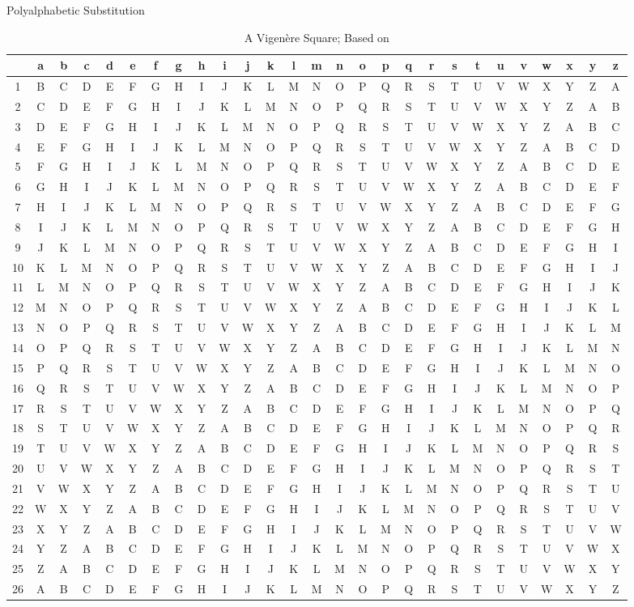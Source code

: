 \documentclass[]{beamer}
\begin{document}
\begin{frame}{Polyalphabetic Substitution}
	\begin{table}
		\centering
		\resizebox{10.5cm}{!} {
			\begin{tabular}{c c c c c c c c c c c c c c c c c c c c c c c c c c c}
				\hline
				& a & b & c & d & e & f & g & h & i & j & k & l & m & n & o & p & q & r & s & t & u & v & w & x & y & z\\
				\hline
				1 &B&C&D&E&F&G&H&I&J&K&L&M&N&O&P&Q&R&S&T&U&V&W&X&Y&Z&A \\
				2 &C&D&E&F&G&H&I&J&K&L&M&N&O&P&Q&R&S&T&U&V&W&X&Y&Z&A&B \\
				3 &D&E&F&G&H&I&J&K&L&M&N&O&P&Q&R&S&T&U&V&W&X&Y&Z&A&B&C \\
				4 &E&F&G&H&I&J&K&L&M&N&O&P&Q&R&S&T&U&V&W&X&Y&Z&A&B&C&D \\
				5 &F&G&H&I&J&K&L&M&N&O&P&Q&R&S&T&U&V&W&X&Y&Z&A&B&C&D&E \\
				6 &G&H&I&J&K&L&M&N&O&P&Q&R&S&T&U&V&W&X&Y&Z&A&B&C&D&E&F \\
				7 &H&I&J&K&L&M&N&O&P&Q&R&S&T&U&V&W&X&Y&Z&A&B&C&D&E&F&G \\
				8 &I&J&K&L&M&N&O&P&Q&R&S&T&U&V&W&X&Y&Z&A&B&C&D&E&F&G&H \\
				9 &J&K&L&M&N&O&P&Q&R&S&T&U&V&W&X&Y&Z&A&B&C&D&E&F&G&H&I \\
				10 &K&L&M&N&O&P&Q&R&S&T&U&V&W&X&Y&Z&A&B&C&D&E&F&G&H&I&J \\
				11 &L&M&N&O&P&Q&R&S&T&U&V&W&X&Y&Z&A&B&C&D&E&F&G&H&I&J&K \\
				12 &M&N&O&P&Q&R&S&T&U&V&W&X&Y&Z&A&B&C&D&E&F&G&H&I&J&K&L \\
				13 &N&O&P&Q&R&S&T&U&V&W&X&Y&Z&A&B&C&D&E&F&G&H&I&J&K&L&M \\
				14 &O&P&Q&R&S&T&U&V&W&X&Y&Z&A&B&C&D&E&F&G&H&I&J&K&L&M&N \\
				15 &P&Q&R&S&T&U&V&W&X&Y&Z&A&B&C&D&E&F&G&H&I&J&K&L&M&N&O \\
				16 &Q&R&S&T&U&V&W&X&Y&Z&A&B&C&D&E&F&G&H&I&J&K&L&M&N&O&P \\
				17 &R&S&T&U&V&W&X&Y&Z&A&B&C&D&E&F&G&H&I&J&K&L&M&N&O&P&Q \\
				18 &S&T&U&V&W&X&Y&Z&A&B&C&D&E&F&G&H&I&J&K&L&M&N&O&P&Q&R \\
				19 &T&U&V&W&X&Y&Z&A&B&C&D&E&F&G&H&I&J&K&L&M&N&O&P&Q&R&S \\
				20 &U&V&W&X&Y&Z&A&B&C&D&E&F&G&H&I&J&K&L&M&N&O&P&Q&R&S&T \\
				21 &V&W&X&Y&Z&A&B&C&D&E&F&G&H&I&J&K&L&M&N&O&P&Q&R&S&T&U \\
				22 &W&X&Y&Z&A&B&C&D&E&F&G&H&I&J&K&L&M&N&O&P&Q&R&S&T&U&V \\
				23 &X&Y&Z&A&B&C&D&E&F&G&H&I&J&K&L&M&N&O&P&Q&R&S&T&U&V&W \\
				24 &Y&Z&A&B&C&D&E&F&G&H&I&J&K&L&M&N&O&P&Q&R&S&T&U&V&W&X \\
				25 &Z&A&B&C&D&E&F&G&H&I&J&K&L&M&N&O&P&Q&R&S&T&U&V&W&X&Y\\
				26 &A&B&C&D&E&F&G&H&I&J&K&L&M&N&O&P&Q&R&S&T&U&V&W&X&Y&Z\\
				\hline
			\end{tabular}
		}
		\caption{A Vigenère Square; Based on \cite{singh1999}}
	\end{table}
\end{frame}
\end{document}
